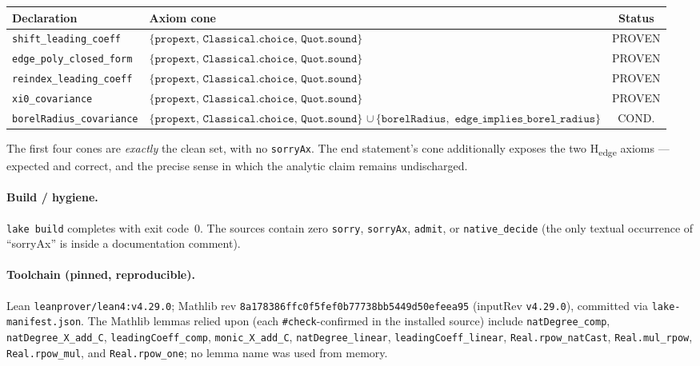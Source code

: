 \documentclass[11pt]{article}
\newcommand{\cone}{\{\texttt{propext},\,\texttt{Classical.choice},\,\texttt{Quot.sound}\}}
\newcommand{\Hedge}{\textsf{H\textsubscript{edge}}}
\begin{document}
\begin{center}
\small
\renewcommand{\arraystretch}{1.3}
\begin{tabular}{@{}l>{\raggedright\arraybackslash}p{6.6cm}c@{}}
\toprule
\textbf{Declaration} & \textbf{Axiom cone} & \textbf{Status}\\
\midrule
\texttt{shift\_leading\_coeff}    & $\cone$ & PROVEN\\
\texttt{edge\_poly\_closed\_form}  & $\cone$ & PROVEN\\
\texttt{reindex\_leading\_coeff}   & $\cone$ & PROVEN\\
\texttt{xi0\_covariance}           & $\cone$ & PROVEN\\
\texttt{borelRadius\_covariance}   & $\cone$ $\cup\,\{\texttt{borelRadius},$ $\texttt{edge\_implies\_borel\_radius}\}$ & COND.\\
\bottomrule
\end{tabular}
\end{center}

\noindent
The first four cones are \emph{exactly} the clean set, with no
\texttt{sorryAx}. The end statement's cone additionally exposes the two
\Hedge{} axioms --- expected and correct, and the precise sense in which the
analytic claim remains undischarged.

\paragraph{Build / hygiene.}
\texttt{lake build} completes with exit code~0. The sources contain zero
\texttt{sorry}, \texttt{sorryAx}, \texttt{admit}, or \texttt{native\_decide}
(the only textual occurrence of ``sorryAx'' is inside a documentation comment).

\paragraph{Toolchain (pinned, reproducible).}
Lean \texttt{leanprover/lean4:v4.29.0}; Mathlib rev
\texttt{8a178386ffc0f5fef0}\allowbreak\texttt{b77738bb5449d50efeea95} (inputRev \texttt{v4.29.0}),
committed via \texttt{lake-manifest.json}. The Mathlib lemmas relied upon
(each \texttt{\#check}-confirmed in the installed source) include
\texttt{natDegree\_comp}, \texttt{natDegree\_X\_add\_C}, \texttt{leadingCoeff\_comp},
\texttt{monic\_X\_add\_C}, \texttt{natDegree\_linear}, \texttt{leadingCoeff\_linear},
\texttt{Real.rpow\_natCast}, \texttt{Real.mul\_rpow}, \texttt{Real.rpow\_mul},
and \texttt{Real.rpow\_one}; no lemma name was used from memory.
\end{document}
